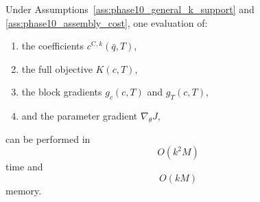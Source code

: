 \begin{theorem}
\label{thm:phase10_complexity}
Under Assumptions~\ref{ass:phase10_general_k_support} and \ref{ass:phase10_assembly_cost}, one evaluation of:
\begin{enumerate}
    \item the coefficients \(c^{\mathrm{C},k}(\bar q,T)\),
    \item the full objective \(K(c,T)\),
    \item the block gradients \(g_c(c,T)\) and \(g_T(c,T)\),
    \item and the parameter gradient \(\nabla_\theta J\),
\end{enumerate}
can be performed in
\begin{equation}
\label{eq:phase10_time_complexity}
O(k^2 M)
\end{equation}
time and
\begin{equation}
\label{eq:phase10_memory_complexity}
O(kM)
\end{equation}
memory.
\end{theorem}

